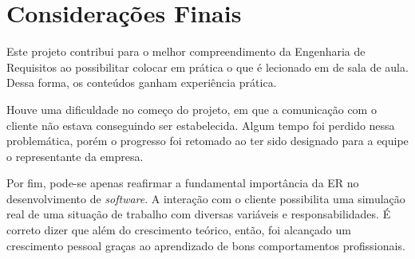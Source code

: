\chapter{Considerações Finais}
\label{final-consideration}

Este projeto contribui para o melhor compreendimento da Engenharia de Requisitos ao possibilitar colocar em prática o que é lecionado em de sala de aula. Dessa forma, os conteúdos ganham experiência prática.

Houve uma dificuldade no começo do projeto, em que a comunicação com o cliente não estava conseguindo ser estabelecida. Algum tempo foi perdido nessa problemática, porém o progresso foi retomado ao ter sido designado para a equipe o representante da empresa.

Por fim, pode-se apenas reafirmar a fundamental importância da ER no desenvolvimento de \textit{software}. A interação com o cliente possibilita uma simulação real de uma situação de trabalho com diversas variáveis e responsabilidades. É correto dizer que além do crescimento teórico, então, foi alcançado um crescimento pessoal graças ao aprendizado de bons comportamentos profissionais.
